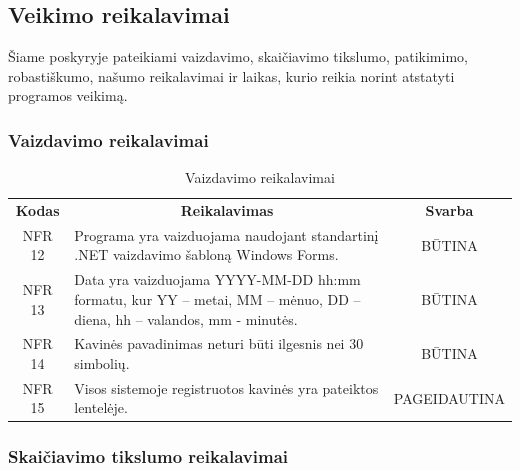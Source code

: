 \documentclass{VUMIFPSkursinis}
\begin{document}
{{{{{\begin{center}
\end{center}
\pagebreak
\subsection{Veikimo reikalavimai}
Šiame poskyryje pateikiami vaizdavimo, skaičiavimo tikslumo, patikimimo, robastiškumo, našumo reikalavimai ir laikas, kurio reikia norint atstatyti programos veikimą.
\subsubsection{Vaizdavimo reikalavimai}

\begin{center}
	\begin{table}[H]
	\caption{Vaizdavimo reikalavimai}
	\begin{tabular}{|p{2cm}|p{}|p{}|}
	\hline
	    \rowcolor{lightgray}
		\multicolumn{3}{|c|}{Vaizdavimo reikalavimai}\\
		
	\hline
		\multicolumn{1}{|c|}{{\bfseries Kodas}}&
		\multicolumn{1}{|c|}{{\bfseries Reikalavimas}}&
		\multicolumn{1}{|c|}{{\bfseries Svarba}}\\
	\hline 	
		\multicolumn{1}{|c|}{NFR 12}&
		{Programa yra vaizduojama naudojant standartinį .NET vaizdavimo šabloną Windows Forms.}&
		\multicolumn{1}{|c|}{BŪTINA}\\	
	
	\hline 	
		\multicolumn{1}{|c|}{NFR 13}&
		{Data yra vaizduojama YYYY-MM-DD hh:mm formatu, kur YY – metai, MM – mėnuo, DD – diena, hh – valandos, mm - minutės.}&
		\multicolumn{1}{|c|}{BŪTINA}\\	
	
	\hline 	
		\multicolumn{1}{|c|}{NFR 14}&
		{Kavinės pavadinimas neturi būti ilgesnis nei 30 simbolių.}&
		\multicolumn{1}{|c|}{BŪTINA}\\	
	
	\hline  	
		\multicolumn{1}{|c|}{NFR 15}&
		{Visos sistemoje registruotos kavinės yra pateiktos lentelėje.}&
		\multicolumn{1}{|p{1.5cm}|}{PAGEIDAUTINA}\\		
	
	\hline 	 	 	
	\end{tabular}
	
	\label{table:Vaizdavimoreikalavimai}
	\end{table}

\end{center}

\subsubsection{Skaičiavimo tikslumo reikalavimai}

}}}}}
\end{document}
